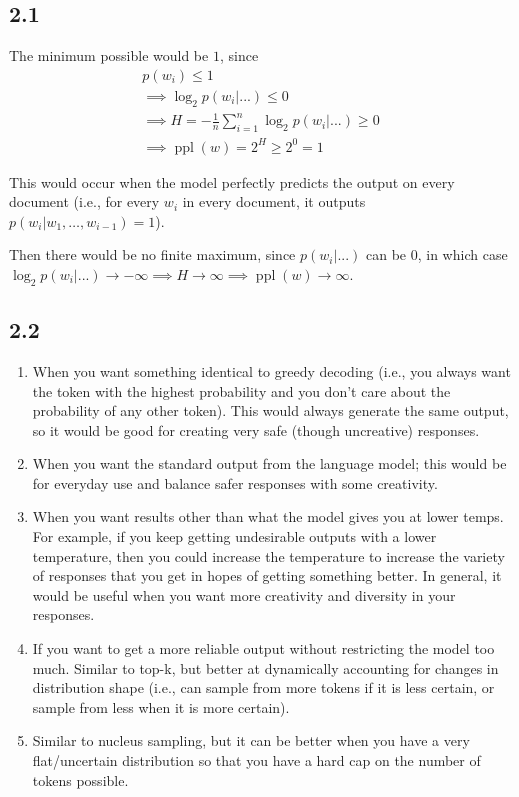 \documentclass{article}
\DeclareMathOperator{\ppl}{{ppl}}
\begin{document}
\subsection*{2.1}
The minimum possible would be $1$, since \begin{gather*}
    p(w_i) \leq 1 \\
    \implies \log_2 p(w_i|...) \leq 0 \\
    \implies H = -\frac{1}{n}\sum_{i=1}^n \log_2p(w_i|...) \geq 0 \\
    \implies \ppl(w) = 2^H \geq 2^0 = 1
\end{gather*}

This would occur when the model perfectly predicts the output on every document (i.e., for every $w_i$ in every document, it outputs $p(w_i | w_1, \dots, w_{i-1}) = 1$).

Then there would be no finite maximum, since $p(w_i|...)$ can be 0, in which case $\log_2 p(w_i|...) \rightarrow -\infty \implies H \rightarrow \infty \implies \ppl(w) \rightarrow \infty$.

\subsection*{2.2}

\renewcommand{\theenumi}{\alph{enumi}}
\begin{enumerate}
    \item When you want something identical to greedy decoding (i.e., you always want the token with the highest probability and you don't care about the probability of any other token). This would always generate the same output, so it would be good for creating very safe (though uncreative) responses.
    \item When you want the standard output from the language model; this would be for everyday use and balance safer responses with some creativity.
    \item When you want results other than what the model gives you at lower temps. For example, if you keep getting undesirable outputs with a lower temperature, then you could increase the temperature to increase the variety of responses that you get in hopes of getting something better. In general, it would be useful when you want more creativity and diversity in your responses.
    \item If you want to get a more reliable output without restricting the model too much. Similar to top-k, but better at dynamically accounting for changes in distribution shape (i.e., can sample from more tokens if it is less certain, or sample from less when it is more certain).
    \item Similar to nucleus sampling, but it can be better when you have a very flat/uncertain distribution so that you have a hard cap on the number of tokens possible.
\end{enumerate}
\renewcommand{\theenumi}{\arabic{enumi}}
\end{document}
